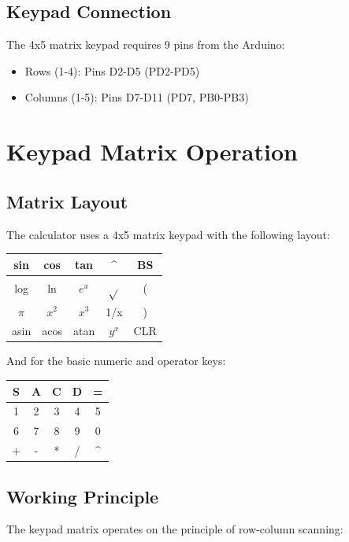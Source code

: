 \documentclass[12pt]{article}
\begin{document}
\subsection*{Keypad Connection}
The 4x5 matrix keypad requires 9 pins from the Arduino:
\begin{itemize}
\item Rows (1-4): Pins D2-D5 (PD2-PD5)
\item Columns (1-5): Pins D7-D11 (PD7, PB0-PB3)
\end{itemize}

\section{Keypad Matrix Operation}

\subsection*{Matrix Layout}
The calculator uses a 4x5 matrix keypad with the following layout:

\begin{center}
\begin{tabular}{|c|c|c|c|c|}
\hline
sin & cos & tan & \textasciicircum & BS \\
\hline
log & ln & $e^x$ & $\sqrt{}$ & ( \\
\hline
$\pi$ & $x^2$ & $x^3$ & 1/x & ) \\
\hline
asin & acos & atan & $y^x$ & CLR \\
\hline
\end{tabular}
\end{center}

And for the basic numeric and operator keys:

\begin{center}
\begin{tabular}{|c|c|c|c|c|}
\hline
S & A & C & D & = \\
\hline
1 & 2 & 3 & 4 & 5 \\
\hline
6 & 7 & 8 & 9 & 0 \\
\hline
+ & - & * & / & \textasciicircum \\
\hline
\end{tabular}
\end{center}

\subsection*{Working Principle}
The keypad matrix operates on the principle of row-column scanning:
\end{document}
